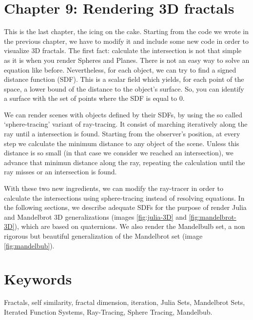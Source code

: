 \section*{Chapter 9: Rendering 3D fractals}

This is the last chapter, the icing on the cake. Starting from the code we wrote in the previous chapter, we have to modify it and include some new code in order to visualize 3D fractals. The first fact: calculate the intersection is not that simple as it is when you render Spheres and Planes. There is not an easy way to solve an equation like before. Nevertheless, for each object, we can try to find a signed distance function (SDF). This is a scalar field which yields, for each point of the space, a lower bound of the distance to the object's surface. So, you can identify a surface with the set of points where the SDF is equal to 0.

We can render scenes with objects defined by their SDFs, by using the so called `sphere-tracing' variant of ray-tracing. It consist of marching iteratively along the ray until a intersection is found. Starting from the observer's position, at every step we calculate the minimum distance to any object of the scene. Unless this distance is so small (in that case we consider we reached an intersection), we advance that minimun distance along the ray, repeating the calculation until the ray misses or an intersection is found.

With these two new ingredients, we can modify the ray-tracer in order to calculate the intersections using sphere-tracing instead of resolving equations. In the following sections, we describe adequate SDFs for the purpose of render Julia and Mandelbrot 3D generalizations (images \ref{fig:julia-3D} and \ref{fig:mandelbrot-3D}), which are based on quaternions. We also render the Mandelbulb set, a non rigorous but beautiful generalization of the Mandelbrot set (image \ref{fig:mandelbub}).

\section*{Keywords}

Fractals, self similarity, fractal dimension, iteration, Julia Sets, Mandelbrot Sets, Iterated Function Systems, Ray-Tracing, Sphere Tracing, Mandelbub. 
